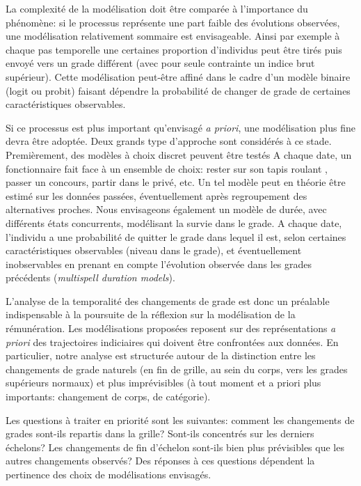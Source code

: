 \documentclass[11pt,a4paper]{article}
\begin{document}
La complexité de la modélisation doit être comparée à l'importance du phénomène: si le processus représente une part faible des évolutions observées, une modélisation relativement sommaire est envisageable. Ainsi par exemple à chaque pas temporelle une certaines proportion d'individus peut être tirés puis envoyé vers un grade différent (avec pour seule contrainte un indice brut supérieur). Cette modélisation peut-être affiné dans le cadre d'un modèle binaire (logit ou probit) faisant dépendre la probabilité de changer de grade de certaines caractéristiques observables. 

Si ce processus est plus important qu'envisagé \textit{a priori}, une modélisation plus fine devra être adoptée. Deux grands type d'approche sont considérés à ce stade. Premièrement, des modèles à choix discret peuvent être testés A chaque date, un fonctionnaire fait face à un ensemble de choix: rester sur son \og tapis roulant \fg{}, passer un concours, partir dans le privé, etc. Un tel modèle peut en théorie être estimé sur les données passées, éventuellement après regroupement des alternatives proches. Nous envisageons également un modèle de durée, avec différents états concurrents, modélisant la survie dans le grade. A chaque date, l'individu a une probabilité de quitter le grade dans lequel il est, selon certaines caractéristiques observables (niveau dans le grade), et éventuellement inobservables en prenant en compte l'évolution observée dans les grades précédents (\textit{multispell duration models}). 


\bigskip

L'analyse de la temporalité des changements de grade est donc un préalable indispensable à la poursuite de la réflexion sur la modélisation de la rémunération. Les modélisations proposées reposent sur des représentations \textit{a priori} des trajectoires indiciaires qui doivent être confrontées aux données. En particulier, notre analyse est structurée autour de la distinction entre les changements de grade \og naturels \fg{} (en fin de grille, au sein du corps, vers les grades supérieurs normaux) et plus imprévisibles (à tout moment et a priori plus importants: changement de corps, de catégorie).  

Les questions à traiter en priorité sont les suivantes: comment les changements de grades sont-ils repartis dans la grille? Sont-ils concentrés sur les derniers échelons? Les changements de fin d'échelon sont-ils bien plus prévisibles que les autres changements observés? Des réponses à ces questions dépendent la pertinence des choix de modélisations envisagés. 


\ifx\isEmbedded\undefined
\newpage
 

\end{document}
